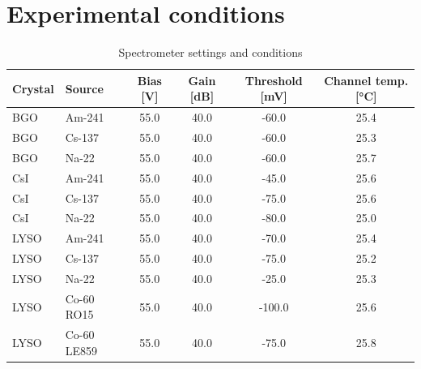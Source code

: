\documentclass[a4paper, 11pt, table]{article}
\begin{document}
\section{Experimental conditions} \label{app:conditions}
\begin{table}[H]
    \centering
    \caption{Spectrometer settings and conditions}
    \label{tab:conditions}
    \begin{tabular}{llcccc}
        \toprule
        Crystal & Source      & Bias [V] & Gain [dB] & Threshold [mV] & Channel temp. [°C] \\
        \midrule
        BGO     & Am-241      & 55.0     & 40.0      & -60.0          & 25.4               \\
        BGO     & Cs-137      & 55.0     & 40.0      & -60.0          & 25.3               \\
        BGO     & Na-22       & 55.0     & 40.0      & -60.0          & 25.7               \\
        CsI     & Am-241      & 55.0     & 40.0      & -45.0          & 25.6               \\
        CsI     & Cs-137      & 55.0     & 40.0      & -75.0          & 25.6               \\
        CsI     & Na-22       & 55.0     & 40.0      & -80.0          & 25.0               \\
        LYSO    & Am-241      & 55.0     & 40.0      & -70.0          & 25.4               \\
        LYSO    & Cs-137      & 55.0     & 40.0      & -75.0          & 25.2               \\
        LYSO    & Na-22       & 55.0     & 40.0      & -25.0          & 25.3               \\
        LYSO    & Co-60 RO15  & 55.0     & 40.0      & -100.0         & 25.6               \\
        LYSO    & Co-60 LE859 & 55.0     & 40.0      & -75.0          & 25.8               \\
        \bottomrule
    \end{tabular}
\end{table}
\end{document}
